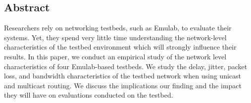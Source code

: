 \subsection*{Abstract}

Researchers rely on networking testbeds, such as Emulab, 
 to evaluate their systems. 
Yet, they spend very little time understanding the 
 network-level characteristics of the testbed environment 
 which will strongly influence their results. 
In this paper, we conduct an empirical study of 
 the network level characteristics of four 
 Emulab-based testbeds.
We study the delay, jitter, packet loss, and bandwidth characteristics 
of the testbed network when using unicast and multicast routing. 
We discuss the implications our finding and the 
  impact  they will have on evaluations conducted 
  on the testbed. 

 